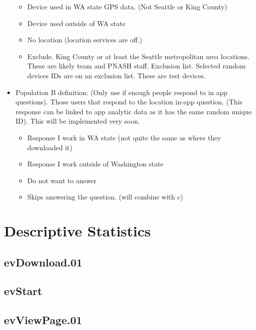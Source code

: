 \documentclass[
]{article}
\providecommand{\tightlist}{%
  \setlength{\itemsep}{0pt}\setlength{\parskip}{0pt}}
\begin{document}
\begin{itemize}
  \begin{itemize}
  \tightlist
  \item
    Device used in WA state GPS data. (Not Seattle or King County)
  \item
    Device used outside of WA state
  \item
    No location (location services are off.)
  \item
    Exclude. King County or at least the Seattle metropolitan area
    locations. These are likely team and PNASH staff. Exclusion list.
    Selected random devices IDs are on an exclusion list. These are test
    devices.
  \end{itemize}
\item
  Population B definition: (Only use if enough people respond to in app
  questions). Those users that respond to the location in-app question.
  (This response can be linked to app analytic data as it has the same
  random unique ID). This will be implemented very soon.

  \begin{itemize}
  \tightlist
  \item
    Response I work in WA state (not quite the same as where they
    downloaded it)
  \item
    Response I work outside of Washington state
  \item
    Do not want to answer
  \item
    Skips answering the question. (will combine with c)
  \end{itemize}
\end{itemize}

\hypertarget{descriptive-statistics}{%
\section{Descriptive Statistics}\label{descriptive-statistics}}

\hypertarget{evdownload.01}{%
\subsection{evDownload.01}\label{evdownload.01}}

\hypertarget{evstart}{%
\subsection{evStart}\label{evstart}}

\hypertarget{evviewpage.01}{%
\subsection{evViewPage.01}\label{evviewpage.01}}
\end{document}
